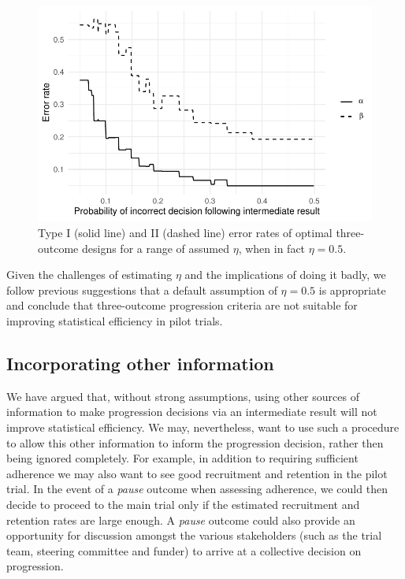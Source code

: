 \documentclass{bmcart}
\begin{document}
\begin{figure}
\centering
\includegraphics[scale=0.8]{./figures/eta_true_ocs}
\caption{Type I (solid line) and II (dashed line) error rates of optimal three-outcome designs for a range of assumed $\eta$, when in fact $\eta = 0.5$.}
\label{fig:eta_true_ocs}
\end{figure}

Given the challenges of estimating $\eta$ and the implications of doing it badly, we follow previous suggestions \cite{Sargent2001a, Dehbi2020} that a default assumption of $\eta = 0.5$ is appropriate and conclude that three-outcome progression criteria are not suitable for improving statistical efficiency in pilot trials.

\subsection{Incorporating other information}\label{sec:information}

We have argued that, without strong assumptions, using other sources of information to make progression decisions via an intermediate result will not improve statistical efficiency. We may, nevertheless, want to use such a procedure to allow this other information to inform the progression decision, rather then being ignored completely. For example, in addition to requiring sufficient adherence we may also want to see good recruitment and retention in the pilot trial. In the event of a \emph{pause} outcome when assessing adherence, we could then decide to proceed to the main trial only if the estimated recruitment and retention rates are large enough. A \emph{pause} outcome could also provide an opportunity for discussion amongst the various stakeholders (such as the trial team, steering committee and funder) to arrive at a collective decision on progression.
\end{document}
